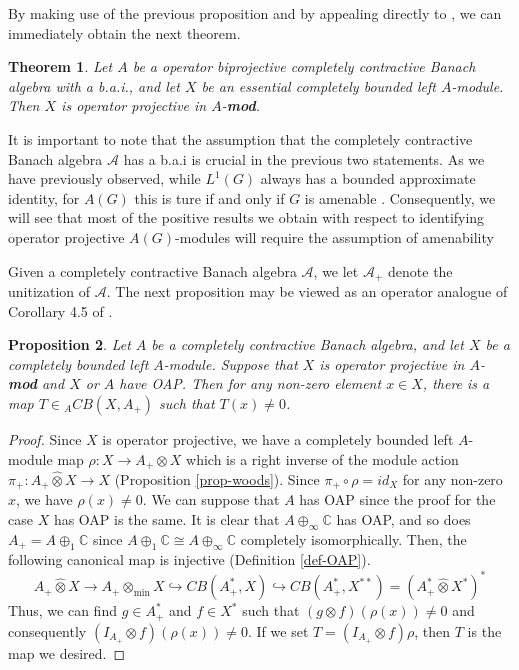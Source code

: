 \documentclass[10pt]{amsart}
\newtheorem{thm}{Theorem}
\newtheorem{prop}[thm]{Proposition}
\numberwithin{thm}{section}
\numberwithin{equation}{section}
\begin{document}
By making use of the previous proposition and by appealing directly to \cite[Lemma 3.23]{W02}, we can immediately 
obtain the next theorem. 

	\begin{thm}\label{thm-essential}
	Let $A$ be a operator biprojective completely contractive Banach algebra with a b.a.i.,
	and let $X$ be an essential completely bounded left $A$-module.
	Then $X$ is operator projective in $A$-{\bf mod}.
	\end{thm}

It is important to note that the assumption that the completely contractive 
Banach algebra $\mathcal{A}$ has a b.a.i is crucial in the previous two statements. As we have 
previously observed, while 
$L^{1}(G)$ always has a bounded approximate identity, for $A(G)$ this is ture if and only if $G$ 
is amenable \cite{Lep}. Consequently, we will see that most of the positive results we 
obtain with respect to identifying operator projective $A(G)$-modules will require the assumption of 
amenability

Given a completely contractive Banach algebra $\mathcal{A}$, we let $\mathcal{A_{+}}$ denote the unitization 
of $\mathcal{A}$. The next proposition may be viewed as an operator analogue of Corollary 4.5 of \cite{Hel}. 

	\begin{prop}\label{prop-proj}
	Let $A$ be a completely contractive Banach algebra, and let $X$ be a completely bounded left $A$-module.
	Suppose that $X$ is operator projective in $A$-{\bf mod} and $X$ or $A$ have OAP.
	Then for any non-zero element $x\in X$, there is a map $T \in {}_A CB(X, A_+)$ such that $T(x) \neq 0$.
	\end{prop}
\begin{proof}
Since $X$ is operator projective, we have a completely bounded left $A$-module map $\rho : X \rightarrow A_+ {\widehat{\otimes}} X$
which is a right inverse of the module action $\pi_+ : A_+ {\widehat{\otimes}} X \rightarrow X$ (Proposition \ref{prop-woods}).
Since $\pi_+ \circ \rho = id_X$ for any non-zero $x$, we have $\rho (x) \neq 0$.
We can suppose that $A$ has OAP since the proof for the case $X$ has OAP is the same.
It is clear that $A\oplus_\infty \mathbb{C}$ has OAP,
and so does $A_+ = A\oplus_1 \mathbb{C}$ since $A \oplus_1 \mathbb{C} \cong A \oplus_\infty \mathbb{C}$ completely isomorphically.
Then, the following canonical map is injective (Definition \ref{def-OAP}).
	$$A_+{\widehat{\otimes}} X \rightarrow A_+ \otimes_{\min} X \hookrightarrow CB(A^*_+, X) \hookrightarrow CB(A^*_+, X^{**}) = (A^*_+ {\widehat{\otimes}} X^*)^*$$
Thus, we can find $g\in A^*_+$ and $f\in X^*$ such that $(g\otimes f) (\rho (x)) \neq 0$ and consequently $(I_{A_+}\otimes f)(\rho (x)) \neq 0$.
If we set $T=(I_{A_+}\otimes f)\rho$, then $T$ is the map we desired.
\end{proof}
\end{document}
